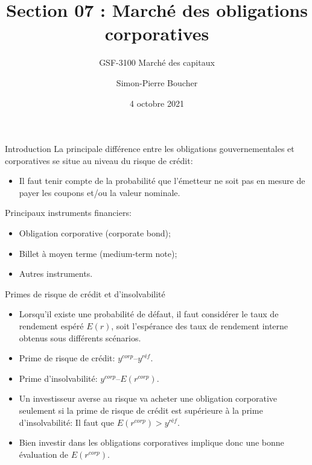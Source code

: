 \documentclass{beamer}
\title[S07  Marché des obligations corporatives]{Section 07 : Marché des obligations corporatives}
\subtitle{GSF-3100 Marché des capitaux}
\author[SP. Boucher]{Simon-Pierre Boucher\inst{1}}
\institute[Université Laval]
{
  \inst{1}%
  Département de finance, assurance et immobilier\\
  Faculté des sciences de l'administration\\
  Université Laval}
\date[Automne 2021]{4 octobre 2021}
\begin{document}
\begin{frame}
\titlepage
\end{frame}

\begin{frame}{Introduction}
La principale différence entre les obligations gouvernementales et corporatives se situe au niveau du risque de crédit: 
\begin{itemize}
\item Il faut tenir compte de la probabilité que l’émetteur ne soit pas en mesure de payer les coupons et/ou la valeur nominale.
\end{itemize}
Principaux instruments financiers:
\begin{itemize}
\item Obligation corporative (corporate bond);
\item Billet à moyen terme (medium-term note); 
\item Autres instruments.
\end{itemize}
\end{frame}


\begin{frame}{Primes de risque de crédit et d’insolvabilité}
\begin{itemize}
\item Lorsqu’il existe une probabilité de défaut, il faut considérer le taux de rendement espéré $E(r)$, soit l’espérance des taux de rendement interne obtenus sous différents scénarios.
\item Prime de risque de crédit: $y^{corp} – y^{réf}$.
\item Prime d’insolvabilité: $y^{corp} – E(r^{corp})$.
\item Un investisseur averse au risque va acheter une obligation corporative seulement si la prime de risque de crédit est supérieure à la prime d’insolvabilité: Il faut que $E(r^{corp}) > y^{réf}$.
\item Bien investir dans les obligations corporatives implique donc une bonne évaluation de $E(r^{corp})$.
\end{itemize}
\end{frame}
\end{document}
